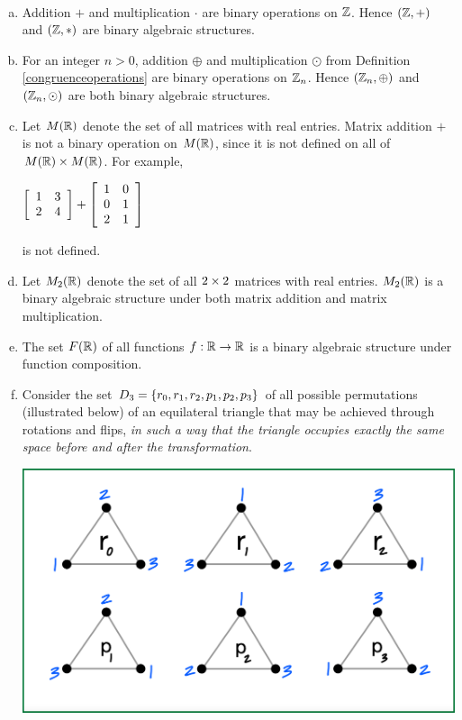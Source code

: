 \documentclass[11pt,fleqn,dvipsnames,usenames]{article}
\begin{document}
\begin{examples}\label{basexamples}~
\begin{enumerate}[(a)]
\item Addition $+$ and multiplication $\cdot$ are binary operations on $\Z$.  Hence $(\Z,+)$ and $(\Z,*)$ are binary algebraic structures.
\item For an integer $n > 0$, addition $\oplus$ and multiplication $\odot$ from Definition \ref{congruenceoperations} are binary operations on $\ZN$.  Hence $(\ZN,\oplus)$ and $(\Z_{n},\odot)$ are both binary algebraic structures.
\item Let $M(\REAL)$ denote the set of all matrices with real entries.  Matrix addition $+$ is not a binary operation on $M(\REAL)$, since it is not defined on all of $M(\REAL)\times M(\REAL)$.  For example,
\begin{center}
$\MATRIX{rr}{1 & 3\\2 & 4} + \MATRIX{rr}{1 & 0\\0 & 1\\2 & 1}$
\end{center}
is not defined.
\item Let $M_{2}(\REAL)$ denote the set of all $2\BY 2$ matrices with real entries.  $M_{2}(\REAL)$ is a binary algebraic structure under both matrix addition and matrix multiplication.
\item The set $F(\REAL)$ of all functions $f:\REAL\to\REAL$ is a binary algebraic structure under function composition.
\item \label{dihedralgroup} Consider the set $D_3 = \SET{r_0,r_1,r_2,p_1,p_2,p_3}$ of all possible permutations (illustrated below) of an equilateral triangle that may be achieved through rotations and flips, \emph{in such a way that the triangle occupies exactly the same space before and after the transformation}.

\begin{center}
\includegraphics[width=0.5\linewidth]{permutationsoftriangle}
\end{center}


\end{enumerate}
\end{examples}
\end{document}
